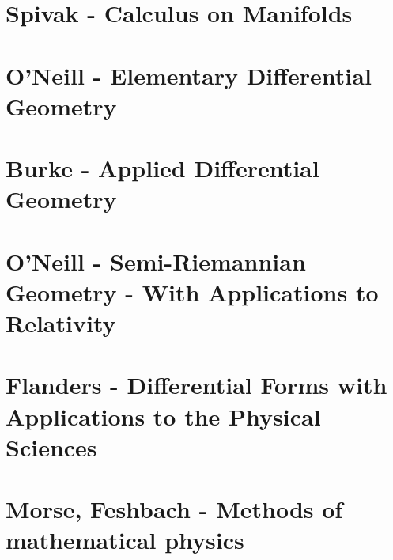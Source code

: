 \documentclass[10pt,a4paper]{book}
\theoremstyle{definition}
\begin{document}
\section{{\sc Spivak} - Calculus on Manifolds}

\section{{\sc O'Neill} - Elementary Differential Geometry}

\section{{\sc Burke} - Applied Differential Geometry}

\section{{\sc O'Neill} - Semi-Riemannian Geometry - With Applications to Relativity}

\section{{\sc Flanders} - Differential Forms with Applications to the Physical Sciences}

\section{{\sc Morse, Feshbach} - Methods of mathematical physics}
\end{document}
